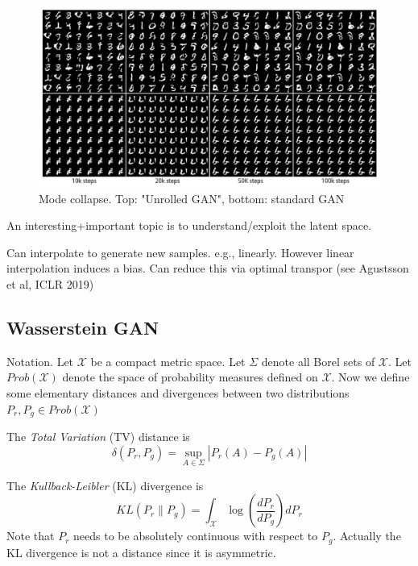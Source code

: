 \documentclass[english]{article}
\begin{document}
\begin{figure}
  \centering
  \includegraphics[scale=0.3]{mc.png}
    \caption{Mode collapse. Top: "Unrolled GAN", bottom: standard GAN}
    \label{mc}
\end{figure}


\item An interesting+important topic is to understand/exploit the latent space.

Can interpolate to generate new samples. e.g., linearly. However linear interpolation induces a bias. Can reduce this via optimal transpor (see Agustsson et al, ICLR 2019)



\eenum

\subsection{Wasserstein GAN}

\benum
\item {Notation}.
 Let $\mathcal{X}$ be a compact metric space. Let $\Sigma$ denote all Borel sets of  $\mathcal{X}$. Let $Prob(\mathcal{X})$ denote the space of probability measures defined on $\mathcal{X}$. Now we define some elementary distances and divergences between two distributions $P_r, P_g \in Prob(\mathcal{X})$


\item {The \emph{Total Variation} (TV) distance} is
$$ \delta(P_r, P_g)= \sup_{A\in \Sigma} {|P_r {(A)}-P_g {(A)}|}$$





\item {The \emph{Kullback-Leibler} (KL) divergence} is
 $$ KL(P_r \|P_g)= \int_\mathcal{X} \log(\frac{dP_r}{dP_g})dP_r$$
 Note that $P_r$ needs to be absolutely continuous with respect to $P_g$. Actually the KL divergence is not a distance since it is asymmetric.
 
\end{document}
